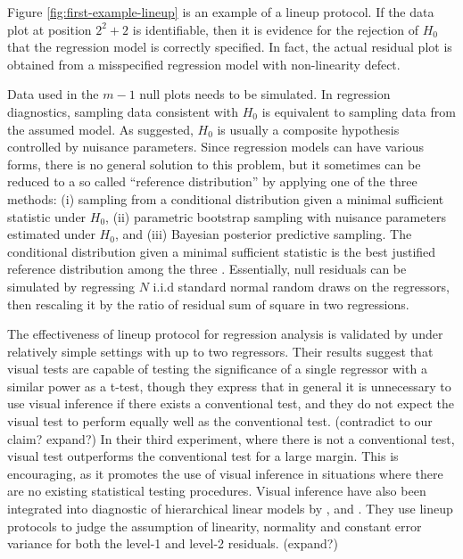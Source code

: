 \documentclass[]{interact}
\theoremstyle{plain}%
\theoremstyle{definition}
\theoremstyle{remark}
\begin{document}
Figure \ref{fig:first-example-lineup} is an example of a lineup
protocol. If the data plot at position \(2^2 + 2\) is identifiable, then
it is evidence for the rejection of \(H_0\) that the regression model is
correctly specified. In fact, the actual residual plot is obtained from
a misspecified regression model with non-linearity defect.

Data used in the \(m - 1\) null plots needs to be simulated. In
regression diagnostics, sampling data consistent with \(H_0\) is
equivalent to sampling data from the assumed model. As
\citet{buja_statistical_2009} suggested, \(H_0\) is usually a composite
hypothesis controlled by nuisance parameters. Since regression models
can have various forms, there is no general solution to this problem,
but it sometimes can be reduced to a so called ``reference
distribution'' by applying one of the three methods: (i) sampling from a
conditional distribution given a minimal sufficient statistic under
\(H_0\), (ii) parametric bootstrap sampling with nuisance parameters
estimated under \(H_0\), and (iii) Bayesian posterior predictive
sampling. The conditional distribution given a minimal sufficient
statistic is the best justified reference distribution among the three
\citep{buja_statistical_2009}. Essentially, null residuals can be
simulated by regressing \(N\) i.i.d standard normal random draws on the
regressors, then rescaling it by the ratio of residual sum of square in
two regressions.

The effectiveness of lineup protocol for regression analysis is
validated by \citet{majumder_validation_2013} under relatively simple
settings with up to two regressors. Their results suggest that visual
tests are capable of testing the significance of a single regressor with
a similar power as a t-test, though they express that in general it is
unnecessary to use visual inference if there exists a conventional test,
and they do not expect the visual test to perform equally well as the
conventional test. (contradict to our claim? expand?) In their third
experiment, where there is not a conventional test, visual test
outperforms the conventional test for a large margin. This is
encouraging, as it promotes the use of visual inference in situations
where there are no existing statistical testing procedures. Visual
inference have also been integrated into diagnostic of hierarchical
linear models by \citet{loy2013diagnostic}, \citet{loy2014hlmdiag} and
\citet{loy2015you}. They use lineup protocols to judge the assumption of
linearity, normality and constant error variance for both the level-1
and level-2 residuals. (expand?)
\end{document}
